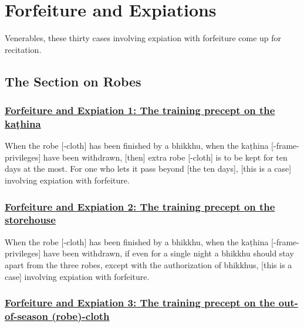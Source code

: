 
\section{Forfeiture and Expiations}
\label{forf-exp}

\begin{intro}
	Venerables, these thirty cases involving expiation with forfeiture come up for recitation.
\end{intro}

\setsubsecheadstyle{\subsectionFmt}
\subsection{The Section on Robes}
\label{forf-exp-robes}

\subsubsection*{\hyperref[np1]{Forfeiture and Expiation 1: The training precept on the kaṭhina}}
\label{forf-exp1}

When the robe [-cloth] has been finished by a bhikkhu, when the kaṭhina [-frame-privileges] have been withdrawn, [then] extra robe [-cloth] is to be kept for ten days at the most. For one who lets it pass beyond [the ten days], [this is a case] involving expiation with forfeiture.



\subsubsection*{\hyperref[np2]{Forfeiture and Expiation 2: The training precept on the storehouse}}
\label{forf-exp2}

When the robe [-cloth] has been finished by a bhikkhu, when the kaṭhina [-frame-privileges] have been withdrawn, if even for a single night a bhikkhu should stay apart from the three robes, except with the authorization of bhikkhus, [this is a case] involving expiation with forfeiture.



\subsubsection*{\hyperref[np3]{Forfeiture and Expiation 3: The training precept on the out-of-season (robe)-cloth}}
\label{forf-exp3}

